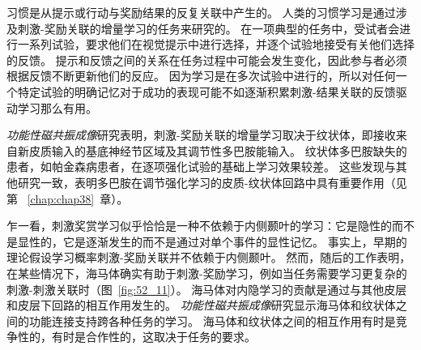 习惯是从提示或行动与奖励结果的反复关联中产生的。
人类的习惯学习是通过涉及刺激-奖励关联的增量学习的任务来研究的。
在一项典型的任务中，受试者会进行一系列试验，要求他们在视觉提示中进行选择，并逐个试验地接受有关他们选择的反馈。
提示和反馈之间的关系在任务过程中可能会发生变化，因此参与者必须根据反馈不断更新他们的反应。
因为学习是在多次试验中进行的，所以对任何一个特定试验的明确记忆对于成功的表现可能不如逐渐积累刺激-结果关联的反馈驱动学习那么有用。


\textit{功能性磁共振成像}研究表明，刺激-奖励关联的增量学习取决于纹状体，即接收来自新皮质输入的基底神经节区域及其调节性多巴胺能输入。
纹状体多巴胺缺失的患者，如帕金森病患者，在逐项强化试验的基础上学习效果较差。
这些发现与其他研究一致，表明多巴胺在调节强化学习的皮质-纹状体回路中具有重要作用（见第 ~\ref{chap:chap38}~章）。


乍一看，刺激奖赏学习似乎恰恰是一种不依赖于内侧颞叶的学习：它是隐性的而不是显性的，它是逐渐发生的而不是通过对单个事件的显性记忆。
事实上，早期的理论假设学习概率刺激-奖励关联并不依赖于内侧颞叶。
然而，随后的工作表明，在某些情况下，海马体确实有助于刺激-奖励学习，例如当任务需要学习更复杂的刺激-刺激关联时（图~\ref{fig:52_11}）。
海马体对内隐学习的贡献是通过与其他皮层和皮层下回路的相互作用发生的。
\textit{功能性磁共振成像}研究显示海马体和纹状体之间的功能连接支持跨各种任务的学习。
海马体和纹状体之间的相互作用有时是竞争性的，有时是合作性的，这取决于任务的要求。


